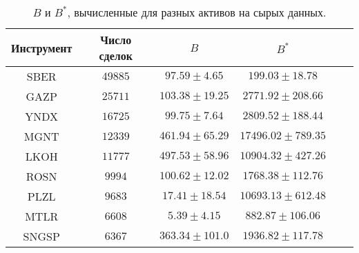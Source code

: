 \begin{table}[h!]
    \begin{center}
        \begin{tabular}{|c|c|c|c|c|c|}
            \hline
            Инструмент        & Число сделок  & $B$ & $B ^*$ \\ \hline
            SBER & $49885$ & $97.59 \pm 4.65$ & $199.03 \pm 18.78$ \\ \hline 
            GAZP & $25711$ & $103.38 \pm 19.25$ & $2771.92 \pm 208.66$ \\ \hline 
            YNDX & $16725$ & $99.75 \pm 7.64$ & $2809.52 \pm 188.44$ \\ \hline 
            MGNT & $12339$ & $461.94 \pm 65.29$ & $17496.02 \pm 789.35$ \\ \hline 
            LKOH & $11777$ & $497.53 \pm 58.96$ & $10904.32 \pm 427.26$ \\ \hline 
            ROSN & $9994$ & $100.62 \pm 12.02$ & $1768.38 \pm 112.76$ \\ \hline 
            PLZL & $9683$ & $17.41 \pm 18.54$ & $10693.13 \pm 612.48$ \\ \hline 
            MTLR & $6608$ & $5.39 \pm 4.15$ & $882.87 \pm 106.06$ \\ \hline 
            SNGSP & $6367$ & $363.34 \pm 101.0$ & $1936.82 \pm 117.78$ \\ \hline 

        \end{tabular}
    \end{center}
    \caption{$B$ и $B ^*$, вычисленные для разных активов на сырых данных.}
    \label{RD_SE_1}
    \end{table} 

